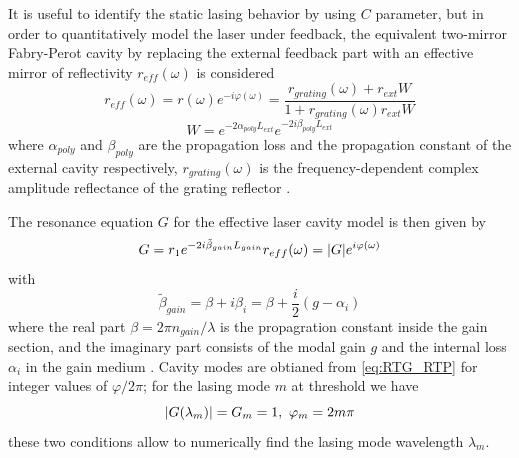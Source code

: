 It is useful to identify the static lasing behavior by using $C$ parameter, but in order to quantitatively model the laser under feedback, the equivalent two-mirror Fabry-Perot cavity by replacing the external feedback part with an effective mirror of reflectivity $r_{eff}(\omega)$ is considered
\begin{equation}
    r_{eff}(\omega)=r(\omega)e^{-i\varphi(\omega)}=\frac{r_{grating}(\omega)+r_{ext}W}{1+r_{grating}(\omega)r_{ext}W}
    \label{eq:effective_reflectivity}
\end{equation}
\begin{equation}
    W=e^{-2\alpha_{poly}L_{ext}}e^{-2i\beta_{poly}L_{ext}}
\end{equation}
where $\alpha_{poly}$ and $\beta_{poly}$ are the propagation loss and the propagation constant of the external cavity respectively, $r_{grating}(\omega)$ is the frequency-dependent complex amplitude reflectance of the grating reflector \cite{yariv1977periodic}.

The resonance equation $G$ for the effective laser cavity model is then given by \cite{vallone2011enhanced}
\begin{equation}
    G=r_1e^{-2i\tilde{\beta}_{gain}L_{gain}}r_{eff}(\omega)=\abs{G}e^{i\varphi(\omega)}
    \label{eq:RTG_RTP}
\end{equation}
with
\begin{equation}
    \tilde{\beta}_{gain}=\beta+i\beta_{i}=\beta+\frac{i}{2}(g-\alpha_{i})
    \label{eq:beta_gain}
\end{equation}
where the real part $\beta=2\pi n_{gain}/\lambda$ is the propagration constant inside the gain section, and the imaginary part consists of the modal gain $g$ and the internal loss $\alpha_i$ in the gain medium \cite{coldren2012diode}. Cavity modes are obtianed from \autoref{eq:RTG_RTP} for integer values of $\varphi/2\pi$; for the lasing mode $m$ at threshold we have
\begin{equation}
    \abs{G(\lambda_m)}=G_m=1,\ \varphi_m=2m\pi
    \label{eq:lasing_condition}
\end{equation}
these two conditions allow to numerically find the lasing mode wavelength $\lambda_m$.

